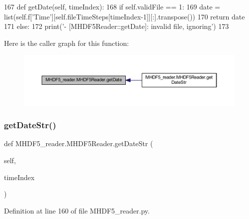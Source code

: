 \begin{DoxyCode}
167     \textcolor{keyword}{def }getDate(self, timeIndex):
168         \textcolor{keywordflow}{if} self.validFile == 1:
169             date = list(self.f[\textcolor{stringliteral}{'Time'}][self.fileTimeSteps[timeIndex-1]][:].transpose())
170             \textcolor{keywordflow}{return} date
171         \textcolor{keywordflow}{else}:
172             print(\textcolor{stringliteral}{'- [MHDF5Reader::getDate]: invalid file, ignoring'})
173                 
\end{DoxyCode}
Here is the caller graph for this function\+:\nopagebreak
\begin{figure}[H]
\begin{center}
\leavevmode
\includegraphics[width=350pt]{class_m_h_d_f5__reader_1_1_m_h_d_f5_reader_a0c16ad2e43bb3171cfec1b227e042218_icgraph}
\end{center}
\end{figure}
\mbox{\label{class_m_h_d_f5__reader_1_1_m_h_d_f5_reader_a81ca43bbc8a077b4daf07e07bba3e31d}} 
\subsubsection{\texorpdfstring{get\+Date\+Str()}{getDateStr()}}
{\footnotesize\ttfamily def M\+H\+D\+F5\+\_\+reader.\+M\+H\+D\+F5\+Reader.\+get\+Date\+Str (\begin{DoxyParamCaption}\item[{}]{self,  }\item[{}]{time\+Index }\end{DoxyParamCaption})}



Definition at line 160 of file M\+H\+D\+F5\+\_\+reader.\+py.



